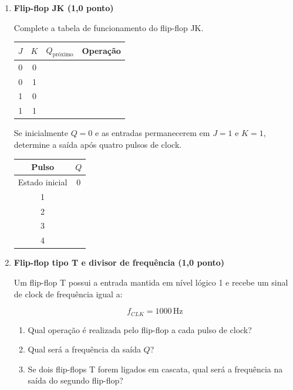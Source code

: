 \documentclass[a4paper,12pt]{article}
\begin{document}
\begin{enumerate}[
    leftmargin=0.8cm,
    label=\textbf{\arabic*.},
    itemsep=0.7cm
]
\newpage


\item \textbf{Flip-flop JK \hfill (1,0 ponto)}

Complete a tabela de funcionamento do flip-flop JK.

\begin{center}
\renewcommand{\arraystretch}{1.5}

\begin{tabular}{|c|c|c|l|}
\hline
$J$ & $K$ & $Q_{\text{próximo}}$ & \textbf{Operação} \\
\hline
0 & 0 & & \\
\hline
0 & 1 & & \\
\hline
1 & 0 & & \\
\hline
1 & 1 & & \\
\hline
\end{tabular}
\end{center}

Se inicialmente $Q=0$ e as entradas permanecerem em $J=1$ e $K=1$, determine
a saída após quatro pulsos de clock.

\begin{center}
\renewcommand{\arraystretch}{1.5}

\begin{tabular}{|c|c|}
\hline
\textbf{Pulso} & $Q$ \\
\hline
Estado inicial & 0 \\
\hline
1 & \\
\hline
2 & \\
\hline
3 & \\
\hline
4 & \\
\hline
\end{tabular}
\end{center}


\item \textbf{Flip-flop tipo T e divisor de frequência \hfill (1,0 ponto)}

Um flip-flop T possui a entrada mantida em nível lógico 1 e recebe um sinal de
clock de frequência igual a:

\[
f_{CLK}=1000\,\text{Hz}
\]

\begin{enumerate}[label=\alph*)]
    \item Qual operação é realizada pelo flip-flop a cada pulso de clock?
    \item Qual será a frequência da saída $Q$?
    \item Se dois flip-flops T forem ligados em cascata, qual será a frequência
    na saída do segundo flip-flop?
\end{enumerate}


\end{enumerate}
\end{document}
